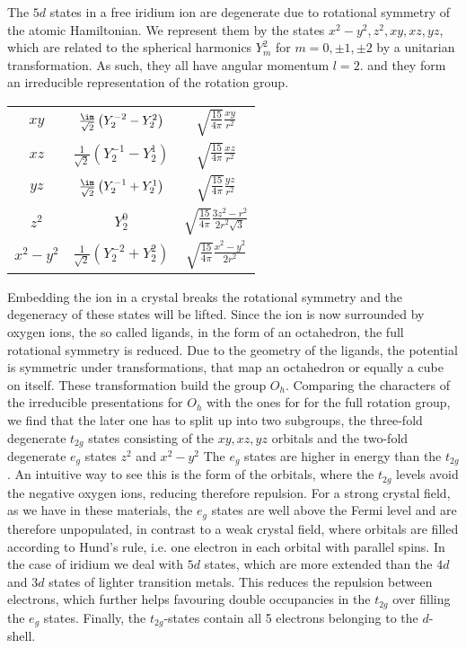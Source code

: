 The $5d$ states  in a free iridium ion are degenerate due to rotational symmetry of the atomic Hamiltonian. 
We represent them by the states $x^2-y^2,z^2,xy,xz,yz$, which are related to the spherical harmonics $Y^2_m$ for $m=0,\pm1,\pm2$ by a unitarian transformation.
As such, they all have angular momentum $l=2$. 
and they form an irreducible representation of the rotation group.
\begin{center}
\begin{tabular}{|c|c|c|}
 \hline
 $xy$ & $\frac{\im}{\sqrt 2} \left( Y^{-2}_2 - Y^2_2 \right)$ & $\sqrt{\frac{15}{4\pi}} \frac{xy}{r^2}$ \\
 $xz$ & $\frac{  1}{\sqrt 2} \left( Y^{-1}_2 - Y^1_2 \right)$ & $\sqrt{\frac{15}{4\pi}} \frac{xz}{r^2}$ \\
 $yz$ & $\frac{\im}{\sqrt 2} \left( Y^{-1}_2 + Y^1_2 \right)$ & $\sqrt{\frac{15}{4\pi}} \frac{yz}{r^2}$ \\
 $z^2$& $ Y^0_{2} 					      $	& $\sqrt{\frac{15}{4\pi}} \frac{3z^2-r^2}{2r^2\sqrt 3} $\\
 $x^2-y^2$&$\frac1{\sqrt 2} \left( Y^{-2}_2 + Y^2_2 \right) $ & $\sqrt{\frac{15}{4\pi}} \frac{x^2-y^2}{2r^2} $ \\
 \hline
\end{tabular}
\end{center}
%
Embedding the ion in a crystal breaks the rotational symmetry and the degeneracy of these states will be lifted.
Since the ion is now surrounded by oxygen ions, the so called ligands, in the form of an octahedron, the 
full rotational symmetry is reduced.
Due to the geometry of the ligands, the potential is symmetric under transformations, that map an octahedron or equally a cube on itself.
These transformation build the group $O_h$.
Comparing the characters of the irreducible presentations for  $O_h$ with the ones for for the full rotation group, we find that 
the later one has to split up into two subgroups, 
the three-fold degenerate $t_{2g}$ states consisting of the $xy,xz,yz$ orbitals and the two-fold degenerate $e_g$ states $z^2$ and $x^2-y^2$ \cite[Chapter~4]{Tinkham64} 
The $e_g$ states are higher in energy than the $t_{2g}$.
An intuitive way to see this is the form of the orbitals, where the $t_{2g}$ levels avoid the negative oxygen ions, reducing therefore repulsion. 
For a strong crystal field, as we have in these materials, the $e_g$ states are well above the Fermi level and are therefore unpopulated,
in contrast to a weak crystal field, where orbitals are filled according to Hund's rule, i.e. one electron in each orbital with parallel spins.
In the case of iridium we deal with  $5d$ states, which are more extended than the $4d$ and $3d$ states of lighter transition metals. 
This reduces the repulsion between electrons, which further helps favouring double occupancies in the $t_{2g}$ over filling the $e_g$ states.
Finally, the $t_{2g}$-states contain all 5 electrons belonging to the $d$-shell.




